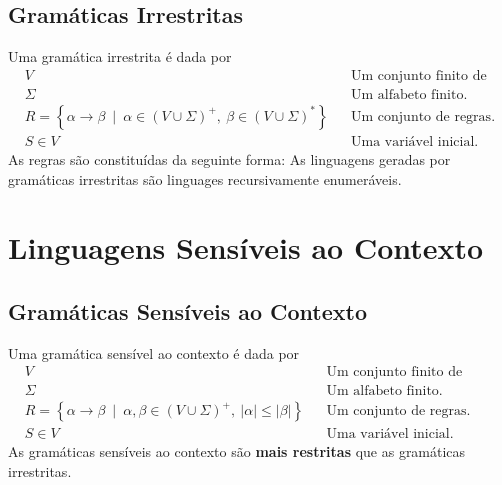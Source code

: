 \documentclass[11pt]{article}
\begin{document}
\subsection{Gramáticas Irrestritas}
\label{sec:org107e8c3}
Uma gramática irrestrita é dada por
\begin{align*}
  & V && \text{Um conjunto finito de variáveis.} \\
  & \Sigma && \text{Um alfabeto finito.} \\
  & R = \left\{ \alpha \to \beta \enspace\big|\enspace \alpha \in \left(V \cup \Sigma\right)^+,\> \beta \in \left(V \cup \Sigma\right)^* \right\} && \text{Um conjunto de regras.} \\
  & S \in V && \text{Uma variável inicial.}
\end{align*}
As regras são constituídas da seguinte forma:
As linguagens geradas por gramáticas irrestritas são linguages recursivamente
enumeráveis.
\section{Linguagens Sensíveis ao Contexto}
\label{sec:org51ffc69}
\subsection{Gramáticas Sensíveis ao Contexto}
\label{sec:org7f59faf}
Uma gramática sensível ao contexto é dada por
\begin{align*}
  & V && \text{Um conjunto finito de variáveis.} \\
  & \Sigma && \text{Um alfabeto finito.} \\
  & R = \left\{ \alpha \to \beta \enspace\big|\enspace \alpha, \beta \in \left(V \cup \Sigma\right)^+,\> |\alpha| \leq |\beta| \right\} && \text{Um conjunto de regras.} \\
  & S \in V && \text{Uma variável inicial.}
\end{align*}
As gramáticas sensíveis ao contexto são \textbf{mais restritas} que as gramáticas irrestritas.
\end{document}
